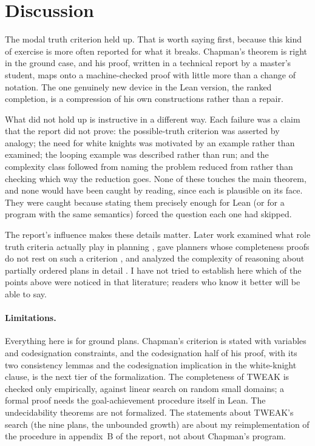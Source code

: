 \documentclass[11pt]{article}
\begin{document}
\section{Discussion}
\label{sec:discussion}

The modal truth criterion held up. That is worth saying first, because
this kind of exercise is more often reported for what it breaks. Chapman's
theorem is right in the ground case, and his proof, written in a technical
report by a master's student, maps onto a machine-checked proof with
little more than a change of notation. The one genuinely new device in the
Lean version, the ranked completion, is a compression of his own
constructions rather than a repair.

What did not hold up is instructive in a different way. Each failure was a
claim that the report did not prove: the possible-truth criterion was
asserted by analogy; the need for white knights was motivated by an
example rather than examined; the looping example was described rather
than run; and the complexity class followed from naming the problem
reduced from rather than checking which way the reduction goes. None of
these touches the main theorem, and none would have been caught by
reading, since each is plausible on its face. They were caught because
stating them precisely enough for Lean (or for a program with the same
semantics) forced the question each one had skipped.

The report's influence makes these details matter. Later work examined
what role truth criteria actually play in planning
\citep{kambhampati1996}, gave planners whose completeness proofs do not
rest on such a criterion \citep{mcallester1991}, and analyzed the
complexity of reasoning about partially ordered plans in detail
\citep{nebel1994}. I have not tried to establish here which of the points
above were noticed in that literature; readers who know it better will be
able to say.

\paragraph{Limitations.} Everything here is for ground plans. Chapman's
criterion is stated with variables and codesignation constraints, and the
codesignation half of his proof, with its two consistency lemmas and the
codesignation implication in the white-knight clause, is the next tier of
the formalization. The completeness of TWEAK is checked only empirically,
against linear search on random small domains; a formal proof needs the
goal-achievement procedure itself in Lean. The undecidability theorems are
not formalized. The statements about TWEAK's search (the nine plans, the
unbounded growth) are about my reimplementation of the procedure in
appendix~B of the report, not about Chapman's program.
\end{document}
